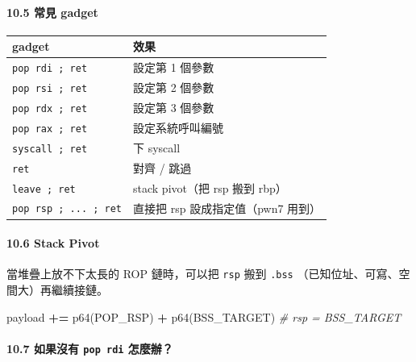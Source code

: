 \documentclass[10pt,a4paper]{article}
\newcounter{none}
\newenvironment{Shaded}{\begin{snugshade}}{\end{snugshade}}
\newcommand{\CommentTok}[1]{\textcolor[rgb]{0.56,0.35,0.01}{\textit{#1}}}
\newcommand{\NormalTok}[1]{#1}
\newcommand{\OperatorTok}[1]{\textcolor[rgb]{0.81,0.36,0.00}{\textbf{#1}}}
\renewenvironment{Shaded}{%
  \def\FrameCommand{\fboxsep=3.2pt\colorbox{shadecolor}}%
  \MakeFramed{\advance\hsize-\width\FrameRestore\small}%
}{%
  \endMakeFramed
}
\begin{document}
\paragraph{10.5 常見 gadget}\label{ux5e38ux898b-gadget}

{\def\LTcaptype{none} %
\begin{longtable}[]{@{}ll@{}}
\toprule\noalign{}
gadget & 效果 \\
\midrule\noalign{}
\endhead
\bottomrule\noalign{}
\endlastfoot
\texttt{pop\ \allowbreak{}rdi\ \allowbreak{};\ \allowbreak{}ret} & 設定第 1 個參數 \\
\texttt{pop\ \allowbreak{}rsi\ \allowbreak{};\ \allowbreak{}ret} & 設定第 2 個參數 \\
\texttt{pop\ \allowbreak{}rdx\ \allowbreak{};\ \allowbreak{}ret} & 設定第 3 個參數 \\
\texttt{pop\ \allowbreak{}rax\ \allowbreak{};\ \allowbreak{}ret} & 設定系統呼叫編號 \\
\texttt{syscall\ \allowbreak{};\ \allowbreak{}ret} & 下 syscall \\
\texttt{ret} & 對齊 / 跳過 \\
\texttt{leave\ \allowbreak{};\ \allowbreak{}ret} & stack pivot（把 rsp 搬到 rbp） \\
\texttt{pop\ \allowbreak{}rsp\ \allowbreak{};\ \allowbreak{}...\allowbreak{}\ \allowbreak{};\ \allowbreak{}ret} & 直接把 rsp 設成指定值（pwn7
用到） \\
\end{longtable}
}

\paragraph{10.6 Stack Pivot}\label{stack-pivot}

當堆疊上放不下太長的 ROP 鏈時，可以把 \texttt{rsp} 搬到 \texttt{.\allowbreak{}bss}
（已知位址、可寫、空間大）再繼續接鏈。

\begin{Shaded}
\begin{Highlighting}[]
\NormalTok{payload }\OperatorTok{+=}\NormalTok{ p64(POP\_RSP) }\OperatorTok{+}\NormalTok{ p64(BSS\_TARGET)   }\CommentTok{\# rsp = BSS\_TARGET}
\end{Highlighting}
\end{Shaded}

\paragraph{\texorpdfstring{10.7 如果沒有 \texttt{pop\ \allowbreak{}rdi}
怎麼辦？}{10.7 如果沒有 pop rdi 怎麼辦？}}\label{ux5982ux679cux6c92ux6709-pop-rdi-ux600eux9ebcux8fa6}
\end{document}
